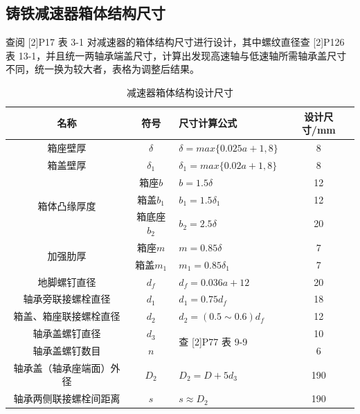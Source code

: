 \documentclass[12pt]{ctexart}
\begin{document}
\subsection{铸铁减速器箱体结构尺寸}

查阅 [2]P17 表 3-1 对减速器的箱体结构尺寸进行设计，其中螺纹直径查 [2]P126 表 13-1，并且统一两轴承端盖尺寸，计算出发现高速轴与低速轴所需轴承盖尺寸不同，统一换为较大者，表格为调整后结果。

\begin{table}[htbp]
    \centering
    \setlength{\belowcaptionskip}{0.3cm}
    \caption{减速器箱体结构设计尺寸}
    \begin{tabular}{c c l c}
        \toprule
        \textbf{名称} & \textbf{符号} & \textbf{尺寸计算公式} & \textbf{设计尺寸/mm} \\
        \midrule
        箱座壁厚                      & $\delta$    & $\delta = max\{0.025a+1,8\}$    & 8 \\
        箱盖壁厚                      & $\delta_1$  & $\delta_1 = max\{0.02a+1,8\}$   & 8 \\
        \multirow{3}{*}{箱体凸缘厚度} & 箱座$b$      & $b=1.5\delta $                  & 12\\
                                     & 箱盖$b_1$    & $b_1 =1.5\delta_1$              & 12\\
                                     & 箱底座$b_2$  & $b_2 =2.5\delta$                & 20 \\
        \multirow{2}{*}{加强肋厚}     & 箱座$m$      & $m=0.85\delta $                & 7 \\
                                     & 箱盖$m_1$    & $m_1=0.85\delta_1$              & 7\\
        地脚螺钉直径                  & $d_f$        & $d_f=0.036a+12$                 & 20 \\
        轴承旁联接螺栓直径             & $d_1$        & $d_1=0.75d_f$                  & 18\\
        箱盖、箱座联接螺栓直径         & $d_2$        & $d_2=(0.5\sim 0.6)d_f$         & 12 \\
        轴承盖螺钉直径                & $d_3$        & \multirow{2}{*}{查 [2]P77 表 9-9} & 10 \\
        轴承盖螺钉数目                & $n$          &                   & 6\\
        轴承盖（轴承座端面）外径       & $D_2$        & $D_2=D+5d_3$                    & 190 \\
        轴承两侧联接螺栓间距离         & $s$          & $s\approx D_2$                  & 190\\

\end{tabular}
\end{table}
\end{document}
